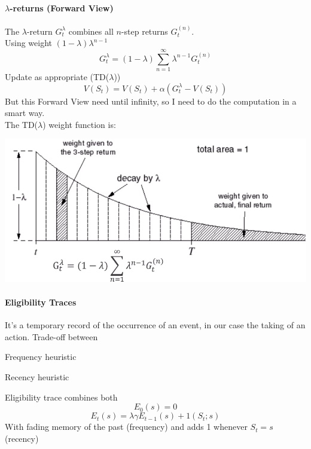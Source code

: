 \documentclass[10pt]{report}
\begin{document}
\paragraph{$\lambda$-returns (Forward View)} The $\lambda$-return $G_t^\lambda$ combines all $n$-step returns $G_t^{(n)}$.\\
Using weight $(1-\lambda)\lambda^{n-1}$
$$G_t^\lambda = (1-\lambda)\sum_{n=1}^\infty \lambda^{n-1}G_t^{(n)}$$
Update as appropriate (TD($\lambda$))
$$V(S_t) = V(S_t) + \alpha\left(G_t^\lambda - V(S_t)\right)$$
But this Forward View need until infinity, so I need to do the computation in a smart way.\\
The TD($\lambda$) weight function is:
\begin{center}
	\includegraphics[scale=0.5]{170.png}
\end{center}
\paragraph{Eligibility Traces} It's a temporary record of the occurrence of an event, in our case the taking of an action. Trade-off between
\begin{list}{}{}
	\item Frequency heuristic
	\item Recency heuristic
\end{list}
Eligibility trace combines both
$$E_0(s) = 0$$
$$E_t(s) = \lambda\gamma E_{t-1}(s) + 1(S_t;s)$$
With fading memory of the past (frequency) and adds 1 whenever $S_t = s$ (recency)
\end{document}
